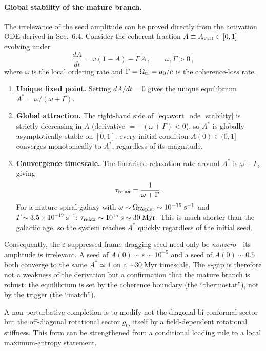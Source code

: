\documentclass[11pt]{article}
\begin{document}
\paragraph{Global stability of the mature branch.}
The irrelevance of the seed amplitude can be proved directly from
the activation ODE derived in Sec.~6.4.  Consider the coherent
fraction $A\equiv A_{\rm vort}\in[0,1]$ evolving under
\begin{equation}\label{eq:avort_ode_stability}
  \frac{dA}{dt}=\omega(1-A)-\Gamma\,A\,,
  \qquad \omega,\Gamma>0\,,
\end{equation}
where $\omega$ is the local ordering rate and
$\Gamma=\Omega_{\rm tr}=a_0/c$ is the coherence-loss rate.
\begin{enumerate}
\item \textbf{Unique fixed point.}
  Setting $dA/dt=0$ gives the unique equilibrium
  $A^{*}=\omega/(\omega+\Gamma)$.
\item \textbf{Global attraction.}
  The right-hand side of~\eqref{eq:avort_ode_stability} is
  strictly decreasing in $A$ (derivative $=-(\omega+\Gamma)<0$),
  so $A^{*}$ is globally asymptotically stable on $[0,1]$: every
  initial condition $A(0)\in(0,1]$ converges monotonically to
  $A^{*}$, regardless of its magnitude.
\item \textbf{Convergence timescale.}
  The linearised relaxation rate around $A^{*}$ is
  $\omega+\Gamma$, giving
  \begin{equation}\label{eq:avort_relax_time}
    \tau_{\rm relax}=\frac{1}{\omega+\Gamma}\,.
  \end{equation}
  For a mature spiral galaxy with $\omega\sim\Omega_{\rm Kepler}
  \sim10^{-15}\;\mathrm{s^{-1}}$ and
  $\Gamma\sim3.5\times10^{-19}\;\mathrm{s^{-1}}$:
  $\tau_{\rm relax}\sim10^{15}\;\mathrm{s}\sim30\;\mathrm{Myr}$.
  This is much shorter than the galactic age, so the system reaches
  $A^{*}$ quickly regardless of the initial seed.
\end{enumerate}
Consequently, the $\varepsilon$-suppressed frame-dragging seed
need only be \emph{nonzero}---its amplitude is irrelevant.
A seed of $A(0)\sim\varepsilon\sim10^{-5}$ and a seed of
$A(0)\sim0.5$ both converge to the same $A^{*}\simeq1$
on a ${\sim}30\;\mathrm{Myr}$ timescale.  The
$\varepsilon$-gap is therefore not a weakness of the derivation
but a confirmation that the mature branch is robust: the
equilibrium is set by the coherence boundary (the ``thermostat''),
not by the trigger (the ``match'').

A non-perturbative completion is to modify not the
diagonal bi-conformal sector but the off-diagonal rotational sector
$g_{0i}$ itself by a field-dependent rotational stiffness.
This form can be strengthened from a conditional loading rule to a local
maximum-entropy statement.
\end{document}
